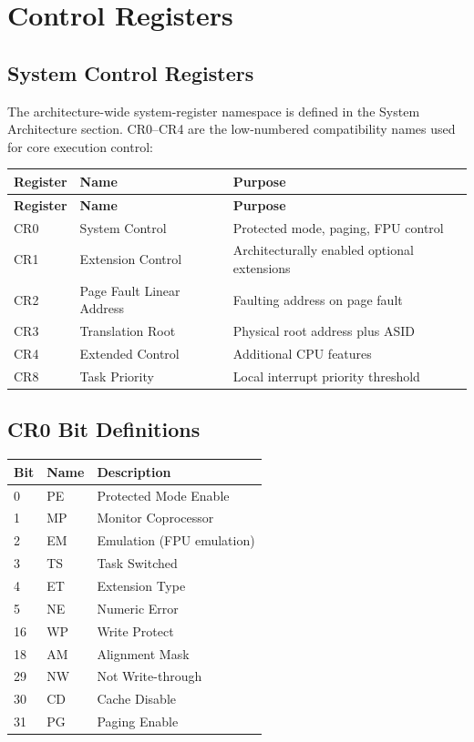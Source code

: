 \documentclass[11pt]{article}
\begin{document}
\section{Control Registers}

\subsection{System Control Registers}

The architecture-wide system-register namespace is defined in the System Architecture section. CR0--CR4 are the low-numbered compatibility names used for core execution control:

\begin{longtable}{@{}lll@{}}
\toprule
\textbf{Register} & \textbf{Name} & \textbf{Purpose} \\ \midrule
\endfirsthead
\toprule
\textbf{Register} & \textbf{Name} & \textbf{Purpose} \\ \midrule
\endhead
CR0 & System Control & Protected mode, paging, FPU control \\
CR1 & Extension Control & Architecturally enabled optional extensions \\
CR2 & Page Fault Linear Address & Faulting address on page fault \\
CR3 & Translation Root & Physical root address plus ASID \\
CR4 & Extended Control & Additional CPU features \\
CR8 & Task Priority & Local interrupt priority threshold \\ \bottomrule
\end{longtable}

\subsection{CR0 Bit Definitions}

\begin{table}[h]
\centering
\begin{tabular}{@{}lll@{}}
\toprule
\textbf{Bit} & \textbf{Name} & \textbf{Description} \\ \midrule
0 & PE & Protected Mode Enable \\
1 & MP & Monitor Coprocessor \\
2 & EM & Emulation (FPU emulation) \\
3 & TS & Task Switched \\
4 & ET & Extension Type \\
5 & NE & Numeric Error \\
16 & WP & Write Protect \\
18 & AM & Alignment Mask \\
29 & NW & Not Write-through \\
30 & CD & Cache Disable \\
31 & PG & Paging Enable \\ \bottomrule
\end{tabular}
\end{table}
\end{document}
